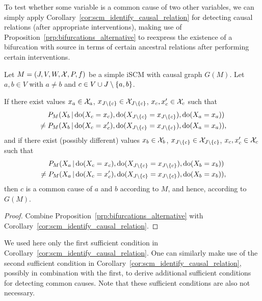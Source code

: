 To test whether some variable is a common cause of two other variables, we can simply apply  Corollary~\ref{cor:scm_identify_causal_relation} for detecting causal relations (after appropriate interventions), making use of Proposition~\ref{prp:bifurcations_alternative} to reexpress the existence of a bifurcation with source in terms of certain ancestral relations after performing certain interventions. 

\begin{Cor}\label{cor:scm_identify_common_cause}
Let $M = \left ( J, V, W, \mathcal{X}, P, f \right )$ be a simple iSCM with causal graph $G(M)$.
Let $a, b \in V$ with $a \ne b$ and $c \in V \cup J \setminus \{a,b\}$.

If there exist values $x_a \in \mathcal{X}_a$, $x_{J\setminus\{c\}} \in \mathcal{X}_{J\setminus\{c\}}$, $x_c,x_c' \in \mathcal{X}_c$ such that
  \begin{equation*}\begin{split}
    & P_M(X_b \operatorname*{|} \operatorname{do}(X_c=x_c),\operatorname{do}(X_{J\setminus \{c\}}=x_{J\setminus \{c\}}),\operatorname{do}(X_a=x_a)) \\
    {} \ne {} & P_M(X_b \operatorname*{|} \operatorname{do}(X_c=x_c'),\operatorname{do}(X_{J\setminus\{c\}}=x_{J\setminus\{c\}}),\operatorname{do}(X_a=x_a)),
  \end{split}\end{equation*}
and if there exist (possibly different) values $x_b \in \mathcal{X}_b$, $x_{J\setminus\{c\}} \in \mathcal{X}_{J\setminus\{c\}}$, $x_c,x_c' \in \mathcal{X}_c$ such that
  \begin{equation*}\begin{split}
    & P_M(X_a \operatorname*{|} \operatorname{do}(X_c=x_c),\operatorname{do}(X_{J\setminus \{c\}}=x_{J\setminus \{c\}}),\operatorname{do}(X_b=x_b)) \\
    {} \ne {} & P_M(X_a \operatorname*{|} \operatorname{do}(X_c=x_c'),\operatorname{do}(X_{J\setminus\{c\}}=x_{J\setminus\{c\}}),\operatorname{do}(X_b=x_b)),
  \end{split}\end{equation*}
then $c$ is a common cause of $a$ and $b$ according to $M$, and hence, according to $G(M)$.
\end{Cor}
\begin{proof}
Combine Proposition~\ref{prp:bifurcations_alternative} with Corollary~\ref{cor:scm_identify_causal_relation}.
\end{proof}  
We used here only the first sufficient condition in Corollary~\ref{cor:scm_identify_causal_relation}. One can similarly make use of the second sufficient condition in Corollary~\ref{cor:scm_identify_causal_relation}, possibly in combination with the first, to derive additional sufficient conditions for detecting common causes.
Note that these sufficient conditions are also not necessary.

